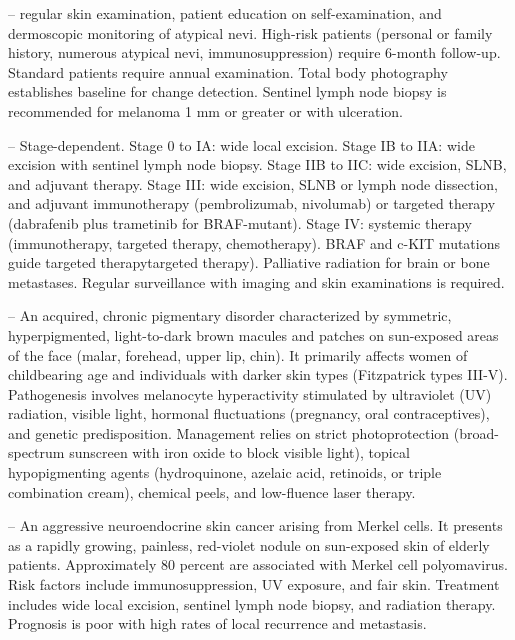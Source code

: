 -- regular skin examination, patient education on self-examination, and dermoscopic monitoring of atypical nevi. High-risk patients (personal or family history, numerous atypical nevi, immunosuppression) require 6-month follow-up. Standard patients require annual examination. Total body photography establishes baseline for change detection. Sentinel lymph node biopsy is recommended for melanoma 1 mm or greater or with ulceration.

-- Stage-dependent. Stage 0 to IA: wide local excision. Stage IB to IIA: wide excision with sentinel lymph node biopsy. Stage IIB to IIC: wide excision, SLNB, and adjuvant therapy. Stage III: wide excision, SLNB or lymph node dissection, and adjuvant immunotherapy (pembrolizumab, nivolumab) or targeted therapy (dabrafenib plus trametinib for BRAF-mutant). Stage IV: systemic therapy (immunotherapy, targeted therapy, chemotherapy). BRAF and c-KIT mutations guide targeted therapytargeted therapy). Palliative radiation for brain or bone metastases. Regular surveillance with imaging and skin examinations is required.

-- An acquired, chronic pigmentary disorder characterized by symmetric, hyperpigmented, light-to-dark brown macules and patches on sun-exposed areas of the face (malar, forehead, upper lip, chin). It primarily affects women of childbearing age and individuals with darker skin types (Fitzpatrick types III-V). Pathogenesis involves melanocyte hyperactivity stimulated by ultraviolet (UV) radiation, visible light, hormonal fluctuations (pregnancy, oral contraceptives), and genetic predisposition. Management relies on strict photoprotection (broad-spectrum sunscreen with iron oxide to block visible light), topical hypopigmenting agents (hydroquinone, azelaic acid, retinoids, or triple combination cream), chemical peels, and low-fluence laser therapy.

-- An aggressive neuroendocrine skin cancer arising from Merkel cells. It presents as a rapidly growing, painless, red-violet nodule on sun-exposed skin of elderly patients. Approximately 80 percent are associated with Merkel cell polyomavirus. Risk factors include immunosuppression, UV exposure, and fair skin. Treatment includes wide local excision, sentinel lymph node biopsy, and radiation therapy. Prognosis is poor with high rates of local recurrence and metastasis.

